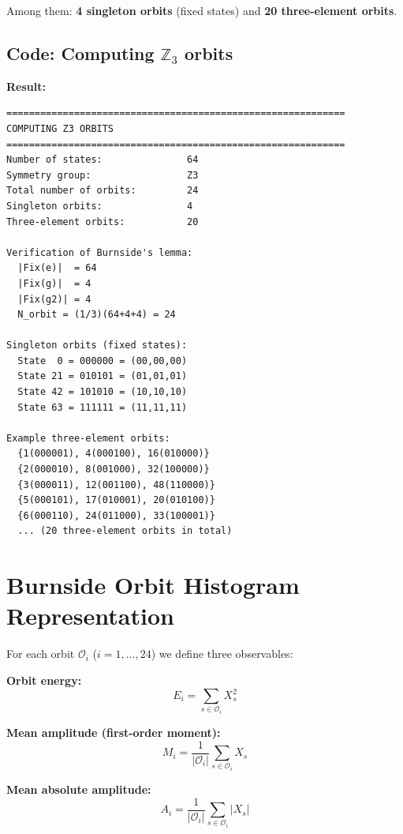 \documentclass[11pt,a4paper]{report}
\begin{document}
Among them: \textbf{4 singleton orbits} (fixed states) and \textbf{20 three-element orbits}.

\subsection{Code: Computing $\mathbb{Z}_3$ orbits}

\noindent{}


\textbf{Result:}
\begin{verbatim}
============================================================
COMPUTING Z3 ORBITS
============================================================
Number of states:               64
Symmetry group:                 Z3
Total number of orbits:         24
Singleton orbits:               4
Three-element orbits:           20

Verification of Burnside's lemma:
  |Fix(e)|  = 64
  |Fix(g)|  = 4
  |Fix(g2)| = 4
  N_orbit = (1/3)(64+4+4) = 24

Singleton orbits (fixed states):
  State  0 = 000000 = (00,00,00)
  State 21 = 010101 = (01,01,01)
  State 42 = 101010 = (10,10,10)
  State 63 = 111111 = (11,11,11)

Example three-element orbits:
  {1(000001), 4(000100), 16(010000)}
  {2(000010), 8(001000), 32(100000)}
  {3(000011), 12(001100), 48(110000)}
  {5(000101), 17(010001), 20(010100)}
  {6(000110), 24(011000), 33(100001)}
  ... (20 three-element orbits in total)
\end{verbatim}


\section{Burnside Orbit Histogram Representation}

For each orbit $\mathcal{O}_i$ ($i = 1,\ldots,24$) we define three observables:

\textbf{Orbit energy:}
\[
E_i = \sum_{s\in\mathcal{O}_i} X_s^2
\]

\textbf{Mean amplitude (first-order moment):}
\[
M_i = \frac{1}{|\mathcal{O}_i|}\sum_{s\in\mathcal{O}_i} X_s
\]

\textbf{Mean absolute amplitude:}
\[
A_i = \frac{1}{|\mathcal{O}_i|}\sum_{s\in\mathcal{O}_i} |X_s|
\]
\end{document}
